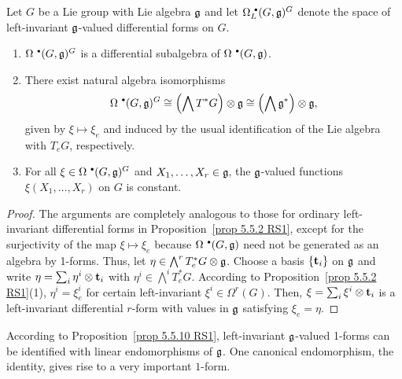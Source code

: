 \begin{prop}[{{\cite[Prop.~5.5.10]{RS1}}}]\label{prop 5.5.10 RS1}
    Let $G$ be a Lie group with Lie algebra $\frakg$ and let $\Omega^{\smbullet }_L(G,\frakg)^G$ denote the space of left-invariant $\frakg$-valued differential forms on $G$.
    \begin{enumerate}
        \item $\Omega^{\smbullet }(G,\frakg)^G$ is a differential subalgebra of $\Omega^{\smbullet }(G,\frakg)$.
        \item There exist natural algebra isomorphisms
        \[\Omega^{\smbullet }(G,\frakg)^G\cong \left(\bigwedge T^\ast G\right)\otimes\frakg\cong \left(\bigwedge\frakg^\ast\right)\otimes\frakg,\]
        given by $\xi\mapsto \xi_e$ and induced by the usual identification of the Lie algebra with $T_eG$, respectively.
        \item For all $\xi\in\Omega^{\smbullet }(G,\frakg)^G$ and $X_1,\ldots,X_r\in\frakg$, the $\frakg$-valued functions $\xi(X_1,\ldots,X_r)$ on $G$ is constant.
    \end{enumerate}
\end{prop}
\begin{proof}
    The arguments are completely analogous to those for ordinary left-invariant differential forms in Proposition~\ref{prop 5.5.2 RS1}, except for the surjectivity of the map $\xi\mapsto \xi_e$ because $\Omega^{\smbullet }(G,\frakg)$ need not be generated as an algebra by 1-forms. Thus, let $\eta\in\bigwedge^r T^\ast_eG\otimes \frakg$. Choose a basis $\{\bf{t}_i\}$ on $\frakg$ and write $\eta=\sum_i\eta^i\otimes \bf{t}_i$ with $\eta^i\in\bigwedge^iT^\ast_eG$. According to Proposition~\ref{prop 5.5.2 RS1}(1), $\eta^i=\xi^i_e$ for certain left-invariant $\xi^i\in\Omega^r(G)$. Then, $\xi=\sum_i\xi^i\otimes \bf{t}_i$ is a left-invariant differential $r$-form with values in $\frakg$ satisfying $\xi_e=\eta$.
\end{proof}

According to Proposition~\ref{prop 5.5.10 RS1}, left-invariant $\frakg$-valued 1-forms can be identified with linear endomorphisms of $\frakg$. One canonical endomorphism, the identity, gives rise to a very important $1$-form.


